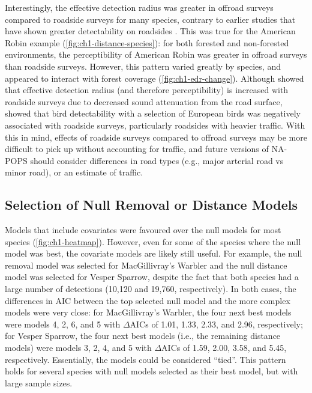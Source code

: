 \par Interestingly, the effective detection radius was greater in offroad surveys compared to roadside surveys for many species, contrary to earlier studies that have shown greater detectability on roadsides \citep{yip_sound_2017}. This was true for the American Robin example (\autoref{fig:ch1-distance-species}): for both forested and non-forested environments, the perceptibility of American Robin was greater in offroad surveys than roadside surveys. However, this pattern varied greatly by species, and appeared to interact with forest coverage (\autoref{fig:ch1-edr-change}). Although \citet{yip_sound_2017} showed that effective detection radius (and therefore perceptibility) is increased with roadside surveys due to decreased sound attenuation from the road surface, \citet{cooke_road_2020} showed that bird detectability with a selection of European birds was negatively associated with roadside surveys, particularly roadsides with heavier traffic. With this in mind, effects of roadside surveys compared to offroad surveys may be more difficult to pick up without accounting for traffic, and future versions of NA-POPS should consider differences in road types (e.g., major arterial road vs minor road), or an estimate of traffic.

\subsection{Selection of Null Removal or Distance Models}

\par Models that include covariates were favoured over the null models for most species (\autoref{fig:ch1-heatmap}). However, even for some of the species where the null model was best, the covariate models are likely still useful. For example, the null removal model was selected for MacGillivray’s Warbler and the null distance model was selected for Vesper Sparrow, despite the fact that both species had a large number of detections (10,120 and 19,760, respectively). In both cases, the differences in AIC between the top selected null model and the more complex models were very close: for MacGillivray’s Warbler, the four next best models were models 4, 2, 6, and 5 with $\Delta$AICs of 1.01, 1.33, 2.33, and 2.96, respectively; for Vesper Sparrow, the four next best models (i.e., the remaining distance models) were models 3, 2, 4, and 5 with $\Delta$AICs of 1.59, 2.00, 3.58, and 5.45, respectively. Essentially, the models could be considered “tied”. This pattern holds for several species with null models selected as their best model, but with large sample sizes. 

